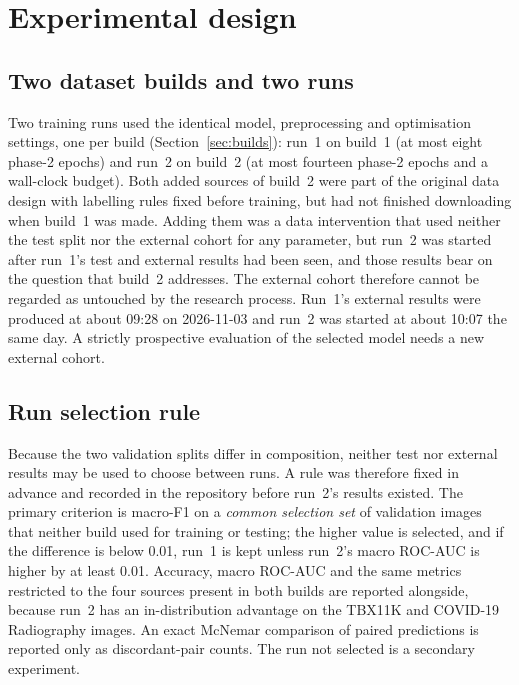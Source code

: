 \section{Experimental design}
\label{sec:design}

\subsection{Two dataset builds and two runs}
Two training runs used the identical model, preprocessing and optimisation settings, one per build (Section~\ref{sec:builds}): run~1 on build~1 (at most eight phase-2 epochs) and run~2 on build~2 (at most fourteen phase-2 epochs and a wall-clock budget). Both added sources of build~2 were part of the original data design with labelling rules fixed before training, but had not finished downloading when build~1 was made. Adding them was a data intervention that used neither the test split nor the external cohort for any parameter, but run~2 was started after run~1's test and external results had been seen, and those results bear on the question that build~2 addresses. The external cohort therefore cannot be regarded as untouched by the research process. Run~1's external results were produced at about 09:28 on 2026-11-03 and run~2 was started at about 10:07 the same day. A strictly prospective evaluation of the selected model needs a new external cohort.

\subsection{Run selection rule}
\label{sec:selection}
Because the two validation splits differ in composition, neither test nor external results may be used to choose between runs. A rule was therefore fixed in advance and recorded in the repository before run~2's results existed. The primary criterion is macro-F1 on a \emph{common selection set} of validation images that neither build used for training or testing; the higher value is selected, and if the difference is below 0.01, run~1 is kept unless run~2's macro ROC-AUC is higher by at least 0.01. Accuracy, macro ROC-AUC and the same metrics restricted to the four sources present in both builds are reported alongside, because run~2 has an in-distribution advantage on the TBX11K and COVID-19 Radiography images. An exact McNemar comparison of paired predictions is reported only as discordant-pair counts. The run not selected is a secondary experiment.

